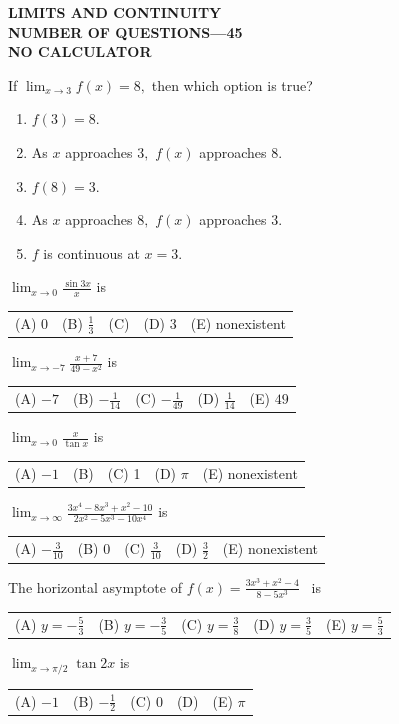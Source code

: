 \documentclass[letterstyle,12pt]{extarticle}
\newcounter{qcounter}
\newcommand{\choices}[5]{
\vspace{0.8em} 
\begin{enumerate}[label=(\Alph*)]
\setlength\itemsep{1em} 
\item
#1 
\item 
#2
\item
#3
\item
#4
\item
#5
\end{enumerate}
}
\newcommand{\choicesline}[5]{    
\vspace{2em} \break 
\begin{tabularx}{0.95 \textwidth} { 
>{\arraybackslash}X 
>{\arraybackslash}X 
>{\arraybackslash}X 
>{\arraybackslash}X 
>{\arraybackslash}X }
(A) \; #1
& 
(B) \; #2
& 
(C) \; #3
& 
(D) \; #4
&
(E) \; #5 
\end{tabularx}
\vspace{2em} \break
}
\newcommand{\ans}[1]{{\color{black} #1}}
\newenvironment{question}
    {\begin{minipage}{0.9 \textwidth}
        \item
    }
    { 
    \end{minipage} \vspace{4ex}
    }
\begin{document}
\begin{center}
    {\bf
    \MakeUppercase{Limits and Continuity\\[1ex]
    NUMBER OF QUESTIONS—45 \\[1ex] 
    NO CALCULATOR \\[5ex]
    }}
\end{center}

\begin{list}{\textbf{.}~}{}
\setlength\itemsep{3em}

\begin{question}
If \(\lim_{x \to 3} f(x) = 8,\) then which option is true?
\choices
{\(f(3) = 8.\)}
{\ans{As \(x\) approaches \(3,\) \(f(x)\) approaches \(8.\)}}
{\(f(8) = 3.\)} 
{As \(x\) approaches \(8,\) \(f(x)\) approaches \(3.\)} 
{\(f\) is continuous at \(x = 3.\)}
\end{question}

\begin{question}
\(\lim_{x \to 0} \frac{\sin 3x}{x}\) is 
\choicesline
{\(0\)}
{\(\frac{1}{3}\)}
{1}
{\ans 3}
{nonexistent}
\end{question}

\begin{question}
\(\lim_{x \to -7} \frac{x + 7}{49 - x^2}\) is 
\choicesline
{\(-7\)}
{\ans{\(-\frac{1}{14}\)}}
{\(-\frac{1}{49}\)}
{\(\frac{1}{14}\)}
{\(49\)}
\end{question}

\begin{question}
\(\lim_{x \to 0} \frac{x}{\tan x}\) is 
\choicesline
{\(-1\)}
{0}
{\ans 1}
{\(\pi\)}
{nonexistent}
\end{question}

\begin{question}
\(\lim_{x \to \infty} \frac{3x^4 - 8x^3 + x^2 - 10}{2x^2 - 5x^3 - 10x^4}\) is 
\choicesline
{\ans{\(-\frac{3}{10}\)}}
{\(0\)}
{\(\frac{3}{10}\)}
{\(\frac{3}{2}\)}
{nonexistent}
\end{question}

\begin{question}
The horizontal asymptote of \(f(x) = \frac{3x^3 + x^2 - 4}{8 - 5x^3}\) \, is \\
\choicesline
{\(y = -\frac{5}{3}\)}
{\ans{\(y = -\frac{3}{5}\)}}
{\(y = \frac{3}{8}\)}
{\(y = \frac{3}{5}\)}
{\(y = \frac{5}{3}\)}
\end{question}

\begin{question}
\(\lim_{x \to \pi/2} \tan 2x\) is
\choicesline
{\(-1\)}
{\(-\frac{1}{2}\)}
{\ans 0}
{1}
{\(\pi\)}
\end{question}


\end{list}
\end{document}
